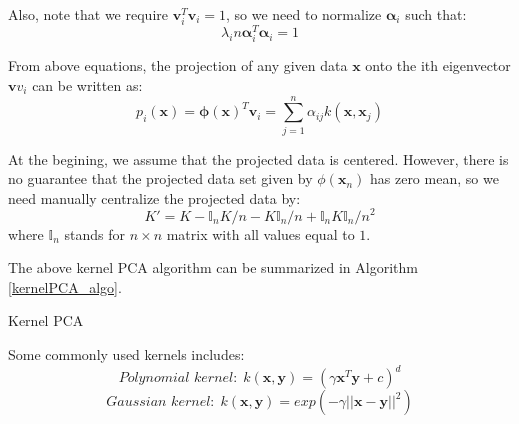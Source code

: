 \documentclass[tikz, multi,dvipsnames,svgnames,x11names]{article}
\makeatletter
\def\BState{\State\hskip-\ALG@thistlm}
\makeatother
\begin{document}
Also, note that we require $\bm{v}_i^T \bm{v}_i = 1$, so we need to normalize $\bm{\alpha}_i$ such that:
\begin{equation}
\label{eq10}
\lambda_i n \bm{\alpha}_i^T \bm{\alpha}_i = 1
\end{equation}

From above equations, the projection of any given data $\bm{x}$ onto the ith eigenvector $\bm{v}v_i$ can be written as:
\begin{equation}
\label{eq11}
p_i(\bm x) = \bm{\phi(x)}^T \bm{v}_i = \sum_{j=1}^n \alpha_{ij} k(\bm{x}, \bm{x}_j)
\end{equation}

At the begining, we assume that the projected data is centered. However, there is no guarantee that the projected data set given by $\phi(\bm{x}_n)$ has zero mean, so we need manually centralize the projected data \cite{bishop2007pattern} by:
\begin{equation}
\label{eq12}
K' = K - \mathbb{I}_nK/n - K\mathbb{I}_n/n + \mathbb{I}_nK\mathbb{I}_n/n^2
\end{equation}
where $\mathbb{I}_n$ stands for $n \times n$ matrix with all values equal to $1$.

The above kernel PCA algorithm can be summarized in Algorithm \ref{kernelPCA_algo}.

\begin{algorithm}[htb]
\caption{Kernel PCA}
\label{kernelPCA_algo}
\end{algorithm}

Some commonly used kernels includes:
\begin{equation}
\label{eq13}
\textit{Polynomial kernel:} \ \  k(\bm{x}, \bm{y}) = (\gamma \bm{x}^T \bm{y} + c)^d
\end{equation}
\begin{equation}
\label{eq14}
\textit{Gaussian kernel:} \ \  k(\bm{x}, \bm{y}) = exp(-\gamma ||\bm{x} - \bm{y}||^2)
\end{equation}
\end{document}
